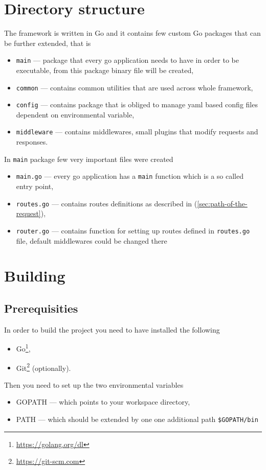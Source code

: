 \section{Directory structure}
The framework is written in Go and it contains few custom Go packages\cite{Packages-go} that can be further extended, that is
\begin{itemize}
\item \verb|main| --- package that every go application needs to have in order to be executable, from this package binary file will be created\cite{Packages-go},
\item \verb|common| --- contains common utilities that are used across whole framework,
\item \verb|config| --- contains package that is obliged to manage yaml based config files dependent on environmental variable,
\item \verb|middleware| --- contains middlewares, small plugins that modify requests and responses.
\end{itemize}

In \verb|main| package few very important files were created
\begin{itemize}
\item \verb|main.go| --- every go application has a \verb|main| function which is a so called entry point,
\item \verb|routes.go| --- contains routes definitions as described in (\ref{sec:path-of-the-request}),
\item \verb|router.go| --- contains function for setting up routes defined in \verb|routes.go| file, default middlewares could be changed there
\end{itemize}

\section{Building}

\subsection{Prerequisities}
In order to build the project you need to have installed the following
\begin{itemize}
\item Go\footnote{\url{https://golang.org/dl}},
\item Git\footnote{\label{git-src}\url{https://git-scm.com}} (optionally).
\end{itemize}
Then you need to set up the two environmental variables
\begin{itemize}
\item GOPATH\cite[The GOPATH environment variable]{Packages-go} --- which points to your workspace directory,
\item PATH --- which should be extended by one one additional path \verb|$GOPATH/bin|
\end{itemize}

